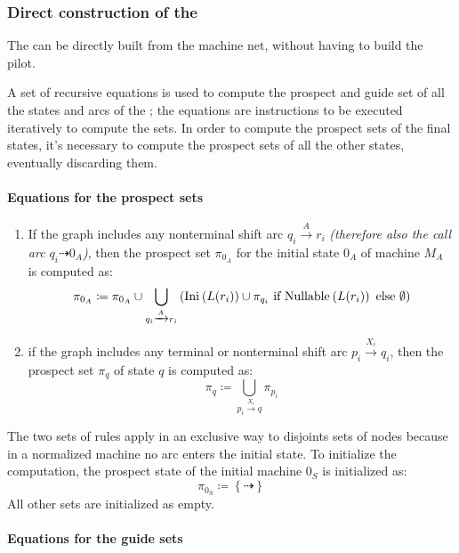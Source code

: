 \documentclass[english]{article}
\begin{document}
\subsubsection{Direct construction of the \PCFG}
\label{sec:direct-contruction-pcfg}

The \PCFG can be directly built from the machine net, without having to build the \elro pilot.

A set of recursive equations is used to compute the prospect and guide set of all the states and arcs of the \PCFG;
the equations are instructions to be executed iteratively to compute the sets.
In order to compute the prospect sets of the final states, it's necessary to compute the prospect sets of all the other states, eventually discarding them.

\paragraph*{Equations for the prospect sets}

\begin{enumerate}
  \item If the graph includes any nonterminal shift arc \(q_i \xrightarrow{A} r_i\)\textit{ (therefore also the call arc \(q_i \dashrightarrow 0_A\))}, then the prospect set \(\pi_{0_A}\) for the initial state \(0_A\) of machine \(M_A\) is computed as:
        \[ \pi_{0_A} \coloneqq \pi_{0_A} \cup \bigcup_{q_i \xrightarrow{A} r_i} \left(  \text{Ini}\hspace{0.1ex} \left( L(r_i) \right) \cup \pi_{q_i} \ \text{if} \ \text{Nullable}\hspace{0.1ex} \left( L(r_i) \right) \ \text{else} \ \emptyset \right) \]
  \item if the graph includes any terminal or nonterminal shift arc \(p_i \xrightarrow{X_i} q_i\), then the prospect set \(\pi_q\) of state \(q\) is computed as:
        \[ \pi_q \coloneqq \bigcup_{p_i \xrightarrow{X_i} q} \pi_{p_i} \]
\end{enumerate}

The two sets of rules apply in an exclusive way to disjoints sets of nodes because in a normalized machine no arc enters the initial state. To initialize the computation, the prospect state of the initial machine \(0_S\) is initialized as:
\[ \pi_{0_S} \coloneqq \left\{ \dashrightarrow \right\} \]
All other sets are initialized as empty.

\paragraph*{Equations for the guide sets}
\end{document}
